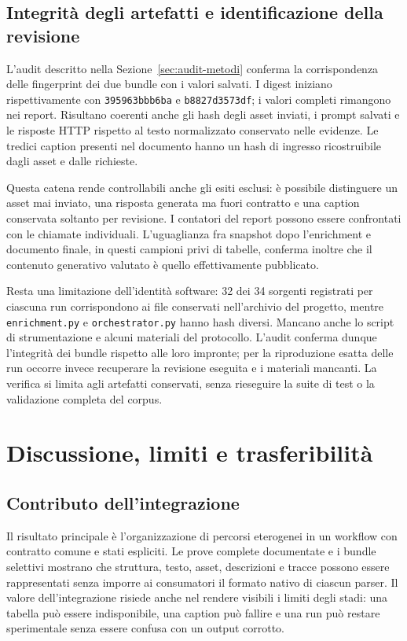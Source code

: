 \subsection{Integrità degli artefatti e identificazione della revisione}

L'audit descritto nella Sezione~\ref{sec:audit-metodi} conferma la corrispondenza delle fingerprint dei due bundle con i valori salvati. I digest iniziano rispettivamente con \texttt{395963bbb6ba} e \texttt{b8827d3573df}; i valori completi rimangono nei report. Risultano coerenti anche gli hash degli asset inviati, i prompt salvati e le risposte HTTP rispetto al testo normalizzato conservato nelle evidenze. Le tredici caption presenti nel documento hanno un hash di ingresso ricostruibile dagli asset e dalle richieste.

Questa catena rende controllabili anche gli esiti esclusi: è possibile distinguere un asset mai inviato, una risposta generata ma fuori contratto e una caption conservata soltanto per revisione. I contatori del report possono essere confrontati con le chiamate individuali. L'uguaglianza fra snapshot dopo l'enrichment e documento finale, in questi campioni privi di tabelle, conferma inoltre che il contenuto generativo valutato è quello effettivamente pubblicato.

Resta una limitazione dell'identità software: 32 dei 34 sorgenti registrati per ciascuna run corrispondono ai file conservati nell'archivio del progetto, mentre \texttt{enrichment.py} e \texttt{orchestrator.py} hanno hash diversi. Mancano anche lo script di strumentazione e alcuni materiali del protocollo. L'audit conferma dunque l'integrità dei bundle rispetto alle loro impronte; per la riproduzione esatta delle run occorre invece recuperare la revisione eseguita e i materiali mancanti. La verifica si limita agli artefatti conservati, senza rieseguire la suite di test o la validazione completa del corpus.

\section{Discussione, limiti e trasferibilità}
\label{sec:limiti}

\subsection{Contributo dell'integrazione}

Il risultato principale è l'organizzazione di percorsi eterogenei in un workflow con contratto comune e stati espliciti. Le prove complete documentate e i bundle selettivi mostrano che struttura, testo, asset, descrizioni e tracce possono essere rappresentati senza imporre ai consumatori il formato nativo di ciascun parser. Il valore dell'integrazione risiede anche nel rendere visibili i limiti degli stadi: una tabella può essere indisponibile, una caption può fallire e una run può restare sperimentale senza essere confusa con un output corrotto.

